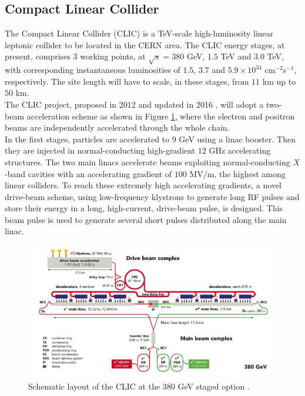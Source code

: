 \subsection*{Compact Linear Collider}
The Compact Linear Collider (CLIC) is a TeV-scale high-luminosity linear leptonic collider to be located in the CERN area. The CLIC energy stages, at present, comprises 3 working points, at $\sqrt{s}= 380$ GeV, $1.5$ TeV and $3.0$ TeV, with corresponding instantaneous luminosities of $1.5$, $3.7$ and $5.9 \times 10^{34}$ cm$^{-2}$s$^{-1}$, respectively. The site length will have to scale, in these stages, from $11$ km up to $50$ km.\\

The CLIC project, proposed in 2012 \cite{CLIC_old1, CLIC_old2, CLIC_old3} and updated in 2016 \cite{CLIC_update}, will adopt a two-beam acceleration scheme as shown in Figure \ref{fig:CLIC}, where the electron and positron beams are independently accelerated through the whole chain.\\
In the first stages, particles are accelerated to $9$ GeV using a linac booster. Then they are injected in normal-conducting high-gradient $12$ GHz accelerating structures. The two main linacs accelerate beams exploiting normal-conducting $X$-band cavities with an accelerating gradient of $100$ MV$/$m, the highest among linear colliders. To reach these extremely high accelerating gradients, a novel drive-beam scheme, using low-frequency klystrons to generate long RF pulses and store their energy in a long, high-current, drive-beam pulse, is designed. This beam pulse is used to generate several short pulses distributed along the main linac.

\begin{figure}
	\centering
	\includegraphics[width=.8\textwidth]{IMG/Cap1/CLIC.png}
	\caption{Schematic layout of the CLIC at the 380 GeV staged option \cite{CLIC_img}.}
	\label{fig:CLIC}
\end{figure}

